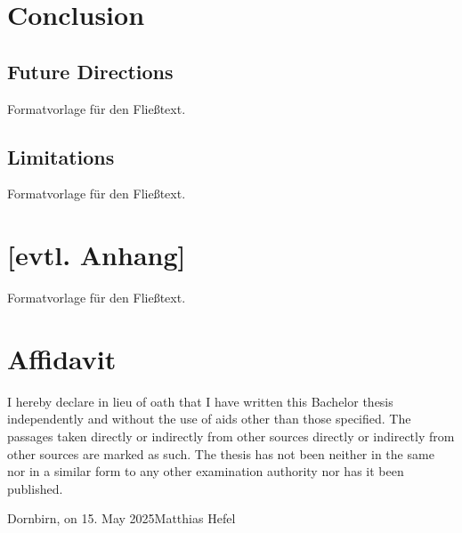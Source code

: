 \documentclass[a4paper,12pt,twoside]{scrreprt}
\begin{document}
\chapter{Conclusion}

\section{Future Directions}
Formatvorlage für den Fließtext.

\section{Limitations}
Formatvorlage für den Fließtext.


\clearpage
{}
{}
\printbibliography


\chapter*{[evtl. Anhang]}  %
Formatvorlage für den Fließtext.


\chapter*{Affidavit}
I hereby declare in lieu of oath that I have written this Bachelor
thesis independently and without the use of aids other than those specified. The passages taken directly or indirectly from other sources
directly or indirectly from other sources are marked as such. The thesis has not been
neither in the same nor in a similar form to any other examination authority
nor has it been published.

\vspace{3cm}
\noindent
Dornbirn, on 15. May 2025\hfill Matthias Hefel
\end{document}
